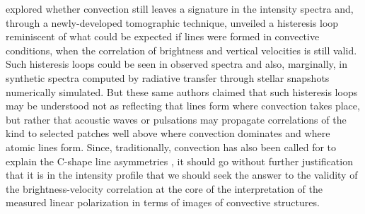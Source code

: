\documentclass{/Users/art2/TeX/aanda/aa}
\begin{document}
\cite{kravchenko_tomography_2018} explored whether convection still leaves a signature in the intensity spectra and, through a newly-developed tomographic technique, unveiled 
a histeresis loop reminiscent of what could be expected if lines were formed in convective conditions, when the correlation of brightness and 
vertical velocities is still valid. Such histeresis loops could be seen in observed spectra and also, marginally, in synthetic spectra computed 
by radiative transfer through stellar snapshots  numerically simulated. But these same authors claimed that such histeresis loops may be understood 
not as reflecting that lines form where convection takes place, but rather that acoustic waves or pulsations may propagate correlations of the 
kind to selected patches well above where convection dominates and where atomic lines form. 
Since, traditionally, convection has also been called for to explain the C-shape line asymmetries \citep{gray_mass_2008}, it should go without further justification that 
it is in the intensity profile that we should seek the answer to the validity of the brightness-velocity correlation at the core of the interpretation
of the measured linear polarization in terms of images of convective structures. 
\end{document}
